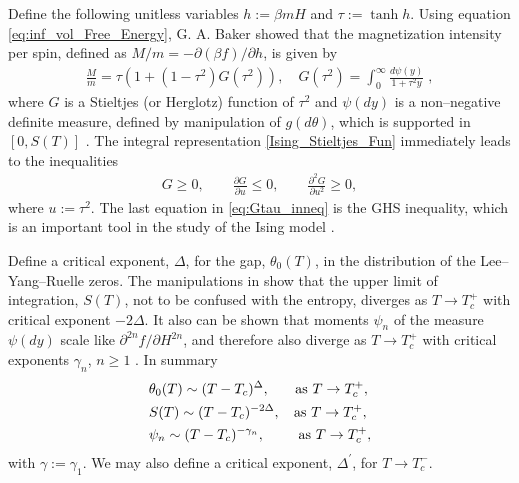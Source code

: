 \documentclass[english,12pt]{ttuthes}
\begin{document}
Define the following unitless variables $h:=\beta mH$ and
$\tau:=\tanh{h}$. Using equation \eqref{eq:inf_vol_Free_Energy}, 
G. A. Baker showed that the magnetization intensity per spin, defined
as $M/m=-\partial(\beta f)/\partial h$, is given by  
%
\begin{align}\label{Ising_Stieltjes_Fun}
  \frac{M}{m} =\tau(1+(1-\tau^2)G(\tau^2)), \quad G(\tau^2)=\int_0^\infty\frac{d\psi(y)}{1+\tau^2y}\;,
\end{align}
%
where $G$ is a Stieltjes (or Herglotz) function of $\tau^2$ and $\psi(dy)$
is a non--negative definite measure, defined by manipulation of
$g(d\theta)$, which is supported in $[0,S(T)]$
\cite{Baker:PR:434,Baker:PRL-990,Baker-1990}. The integral
representation \eqref{Ising_Stieltjes_Fun} immediately leads to the
inequalities
%
\begin{align}\label{eq:Gtau_inneq}
  G\geq0, \qquad \frac{\partial G}{\partial u}\leq0, \qquad \frac{\partial^2G}{\partial u^2}\geq0,
\end{align}
%
where $u:=\tau^2$. The last equation in \eqref{eq:Gtau_inneq} is the GHS
inequality, which is an important tool in the study of the Ising model
\cite{Golden:JMP-5627}. 

Define a critical exponent, $\Delta$, for the gap, $\theta_0(T)$, in the
distribution of the Lee--Yang--Ruelle zeros. The manipulations in
\cite{Baker:PR:434,Baker:PRL-990} show that the upper limit of
integration, $S(T)$, not to be confused with the entropy, diverges as
$T\to T_c^+$ with critical exponent $-2\Delta$. It also can be shown that
moments $\psi_n$ of the measure $\psi(dy)$ scale like $\partial^{2n}f/\partial H^{2n}$,
and therefore also diverge as $T\to T_c^+$ with critical exponents
$\gamma_n$, $n\geq1$ \cite{Baker:PR:434,Baker:PRL-990,Baker-1990}. In summary  
%
\begin{align}
  &\theta_0(T)\sim(T-T_c)^\Delta, \hspace{0.25in} \text{as  } T\to T_c^+,\\
  &S(T)\sim(T-T_c)^{-2\Delta}, \hspace{0.13in} \text{as  }  T\to T_c^+,\notag\\
  &\psi_n\sim(T-T_c)^{-\gamma_n}, \hspace{0.33in} \text{as  }  T\to T_c^+,\notag
\end{align}
%
with $\gamma:=\gamma_1$. We may also define a critical exponent, $\Delta^\prime$, for
$T\to T_c^-$.
\end{document}

